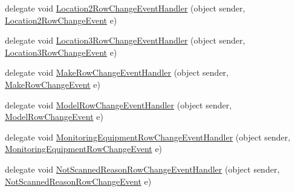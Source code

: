\begin{DoxyCompactItemize}
\item 
delegate void \hyperlink{class_env_int_1_1_win32_1_1_field_tech_1_1_manager_1_1_data_sets_1_1_guide_ware_mobile_data_set_a2de82c6aada07f571f168a4bf62f5bed}{Location2\+Row\+Change\+Event\+Handler} (object sender, \hyperlink{class_env_int_1_1_win32_1_1_field_tech_1_1_manager_1_1_data_sets_1_1_guide_ware_mobile_data_set_1_1_location2_row_change_event}{Location2\+Row\+Change\+Event} e)
\item 
delegate void \hyperlink{class_env_int_1_1_win32_1_1_field_tech_1_1_manager_1_1_data_sets_1_1_guide_ware_mobile_data_set_ab06bf43328e17eae771a2c07d051b9b3}{Location3\+Row\+Change\+Event\+Handler} (object sender, \hyperlink{class_env_int_1_1_win32_1_1_field_tech_1_1_manager_1_1_data_sets_1_1_guide_ware_mobile_data_set_1_1_location3_row_change_event}{Location3\+Row\+Change\+Event} e)
\item 
delegate void \hyperlink{class_env_int_1_1_win32_1_1_field_tech_1_1_manager_1_1_data_sets_1_1_guide_ware_mobile_data_set_a6eb1ddef39be33cf18a268b05cd32b4f}{Make\+Row\+Change\+Event\+Handler} (object sender, \hyperlink{class_env_int_1_1_win32_1_1_field_tech_1_1_manager_1_1_data_sets_1_1_guide_ware_mobile_data_set_1_1_make_row_change_event}{Make\+Row\+Change\+Event} e)
\item 
delegate void \hyperlink{class_env_int_1_1_win32_1_1_field_tech_1_1_manager_1_1_data_sets_1_1_guide_ware_mobile_data_set_a229f51edc1098ac0242fa8a6b9b52f8b}{Model\+Row\+Change\+Event\+Handler} (object sender, \hyperlink{class_env_int_1_1_win32_1_1_field_tech_1_1_manager_1_1_data_sets_1_1_guide_ware_mobile_data_set_1_1_model_row_change_event}{Model\+Row\+Change\+Event} e)
\item 
delegate void \hyperlink{class_env_int_1_1_win32_1_1_field_tech_1_1_manager_1_1_data_sets_1_1_guide_ware_mobile_data_set_a394b1514a56224f6d11f74408383305b}{Monitoring\+Equipment\+Row\+Change\+Event\+Handler} (object sender, \hyperlink{class_env_int_1_1_win32_1_1_field_tech_1_1_manager_1_1_data_sets_1_1_guide_ware_mobile_data_set_508b9e1e7fb778ecd4f9ec08c0203079}{Monitoring\+Equipment\+Row\+Change\+Event} e)
\item 
delegate void \hyperlink{class_env_int_1_1_win32_1_1_field_tech_1_1_manager_1_1_data_sets_1_1_guide_ware_mobile_data_set_a648fc43ba2f86d7260eb36d5f83eef39}{Not\+Scanned\+Reason\+Row\+Change\+Event\+Handler} (object sender, \hyperlink{class_env_int_1_1_win32_1_1_field_tech_1_1_manager_1_1_data_sets_1_1_guide_ware_mobile_data_set_26a68af3739fcf7dfebacfa26943a678}{Not\+Scanned\+Reason\+Row\+Change\+Event} e)

\end{DoxyCompactItemize}
